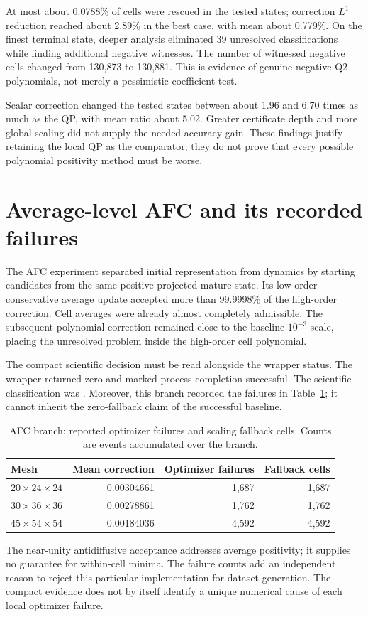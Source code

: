 At most about 0.0788\% of cells were rescued in the tested states; correction $L^1$ reduction reached about 2.89\% in the best case, with mean about 0.779\%. On the finest terminal state, deeper analysis eliminated 39 unresolved classifications while finding additional negative witnesses. The number of witnessed negative cells changed from 130,873 to 130,881. This is evidence of genuine negative Q2 polynomials, not merely a pessimistic coefficient test.

Scalar correction changed the tested states between about 1.96 and 6.70 times as much as the QP, with mean ratio about 5.02. Greater certificate depth and more global scaling did not supply the needed accuracy gain. These findings justify retaining the local QP as the comparator; they do not prove that every possible polynomial positivity method must be worse.

\section{Average-level AFC and its recorded failures}
The AFC experiment separated initial representation from dynamics by starting candidates from the same positive projected mature state. Its low-order conservative average update accepted more than 99.9998\% of the high-order correction. Cell averages were already almost completely admissible. The subsequent polynomial correction remained close to the baseline $10^{-3}$ scale, placing the unresolved problem inside the high-order cell polynomial.

The compact scientific decision must be read alongside the wrapper status. The wrapper returned zero and marked process completion successful. The scientific classification was . Moreover, this branch recorded the failures in Table~\ref{tab:afcfail}; it cannot inherit the zero-fallback claim of the successful baseline.
\begin{table}[htbp]\centering\caption{AFC branch: reported optimizer failures and scaling fallback cells. Counts are events accumulated over the branch.}\label{tab:afcfail}
\begin{tabular}{lrrr}\toprule Mesh & Mean correction & Optimizer failures & Fallback cells\\\midrule
$20\times24\times24$ & 0.00304661 & 1,687 & 1,687\\
$30\times36\times36$ & 0.00278861 & 1,762 & 1,762\\
$45\times54\times54$ & 0.00184036 & 4,592 & 4,592\\\bottomrule\end{tabular}\end{table}
The near-unity antidiffusive acceptance addresses average positivity; it supplies no guarantee for within-cell minima. The failure counts add an independent reason to reject this particular implementation for dataset generation. The compact evidence does not by itself identify a unique numerical cause of each local optimizer failure.

